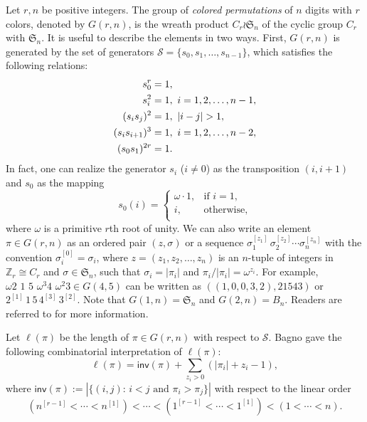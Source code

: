 \documentclass[a4paper, reqno, 11pt]{amsart}
\newcommand{\inv}{{\textsf{inv}}}
\numberwithin{equation}{section}
\begin{document}
Let $r,n$ be positive integers. 
The group of \emph{colored permutations} of $n$ digits with $r$ colors, denoted by $G(r,n)$, is the wreath product $C_r\wr \mathfrak{S}_n$ of the cyclic group $C_r$ with $\mathfrak{S}_n$. 
It is useful to describe the elements in two ways.
First, $G(r,n)$ is generated by the set of generators $\mathcal{S}=\{s_0,s_1,\ldots,s_{n-1}\}$, which satisfies the following relations:
\begin{align} \label{eq:wreath_product}
s_0^r &= 1, \notag \\
s_i^2 &= 1, \text{ } i=1,2,\ldots,n-1, \notag \\
(s_is_j)^2 &= 1, \text{ } |i-j|>1, \notag \\
(s_is_{i+1})^3 &= 1, \text{ } i=1,2,\ldots,n-2, \\
(s_0s_1)^{2r} &= 1. \notag
\end{align}
In fact, one can realize the generator $s_i$ ($i\neq 0$) as the transposition $(i,i+1)$ and $s_0$ as the mapping
$$ s_0(i)=\left\{ \begin{array}{ll}
\omega\cdot 1, & \text{if }i=1,\\
i, & \text{otherwise,}\\
\end{array}\right. $$
where $\omega$ is a primitive $r$th root of unity.
We can also write an element $\pi\in G(r,n)$ as an ordered pair $(z,\sigma)$ or a sequence $\sigma_1^{[z_1]}\,\sigma_2^{[z_2]}\cdots\sigma_n^{[z_n]}$ with the convention $\sigma_i^{[0]}=\sigma_i$, where $z=(z_1,z_2,\ldots,z_n)$ is an $n$-tuple of integers in $\mathbb{Z}_r\cong C_r$ and $\sigma\in \mathfrak{S}_n$, such that $\sigma_i=|\pi_i|$ and ${\pi_i}/{|\pi_i|}=\omega^{z_i}$. 
For example, $\omega 2\,\,1\,\,5\,\,\omega^3 4\,\,\omega^2 3\in G(4,5)$ can be written as $((1,0,0,3,2),21543)$ or $2^{[1]}\,1\,5\,4^{[3]}\,3^{[2]}$. 
Note that $G(1,n)=\mathfrak{S}_n$ and $G(2,n)=B_n$.
Readers are referred to \cite{Adin_Roichman_01, Bagno_04, Haglund_Loehr_Remmel_05} for more
information.

Let $\ell(\pi)$ be the length of $\pi\in G(r,n)$ with respect to $\mathcal{S}$. 
Bagno \cite{Bagno_04} gave the following combinatorial interpretation of $\ell(\pi)$:
\begin{equation}\label{eq:length_Grn}
\ell(\pi)=\inv(\pi)+\sum_{z_i>0}(|\pi_i|+z_i-1),
\end{equation}
where $\inv(\pi):=|\{(i,j):\,i<j\text{ and }\pi_i>\pi_j\}|$ with respect to the linear order
\begin{equation}\label{eq:order_wreath}
(n^{[r-1]}<\cdots<n^{[1]}) <\cdots< (1^{[r-1]}<\cdots<1^{[1]}) < (1<\cdots<n).
\end{equation}
\end{document}

